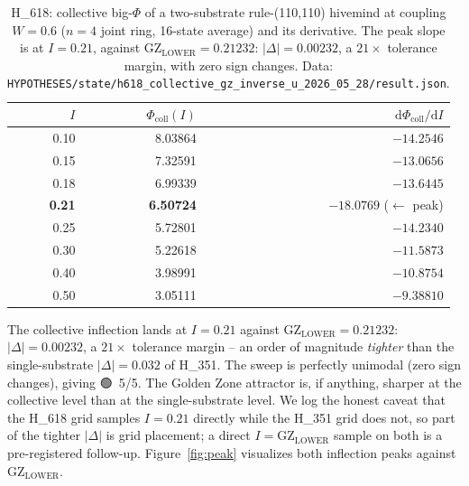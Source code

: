 \documentclass[11pt,a4paper]{article}
\providecommand{\tierGreen}{🟢}
\newcommand{\GZL}{\mathrm{GZ_{LOWER}}}
\begin{document}
\begin{table}[h]
\centering
\small
\begin{tabular}{rrr}
\toprule
\textbf{$I$} & \textbf{$\Phi_{\mathrm{coll}}(I)$}
& \textbf{$\mathrm{d}\Phi_{\mathrm{coll}}/\mathrm{d}I$} \\
\midrule
0.10 & 8.03864 & $-14.2546$ \\
0.15 & 7.32591 & $-13.0656$ \\
0.18 & 6.99339 & $-13.6445$ \\
\textbf{0.21} & \textbf{6.50724} & $\mathbf{-18.0769}$ \;($\leftarrow$ peak) \\
0.25 & 5.72801 & $-14.2340$ \\
0.30 & 5.22618 & $-11.5873$ \\
0.40 & 3.98991 & $-10.8754$ \\
0.50 & 3.05111 & $-9.38810$ \\
\bottomrule
\end{tabular}
\caption{H\_618: collective big-$\Phi$ of a two-substrate rule-(110,110)
hivemind at coupling $W=0.6$ ($n=4$ joint ring, 16-state average) and its
derivative. The peak slope is at $I=0.21$, against $\GZL=0.21232$:
$|\Delta|=0.00232$, a $21\times$ tolerance margin, with zero sign changes.
Data: \texttt{HYPOTHESES/state/h618\_collective\_gz\_inverse\_u\_2026\_05\_28/result.json}.}
\label{tab:h618}
\end{table}

The collective inflection lands at $I=0.21$ against $\GZL=0.21232$:
$|\Delta|=0.00232$, a $21\times$ tolerance margin -- an order of magnitude
\emph{tighter} than the single-substrate $|\Delta|=0.032$ of H\_351. The
sweep is perfectly unimodal (zero sign changes), giving \tierGreen\ 5/5.
The Golden Zone attractor is, if anything, sharper at the collective level
than at the single-substrate level. We log the honest caveat that the
H\_618 grid samples $I=0.21$ directly while the H\_351 grid does not, so
part of the tighter $|\Delta|$ is grid placement; a direct
$I=\GZL$ sample on both is a pre-registered follow-up.
Figure~\ref{fig:peak} visualizes both inflection peaks against $\GZL$.
\end{document}
